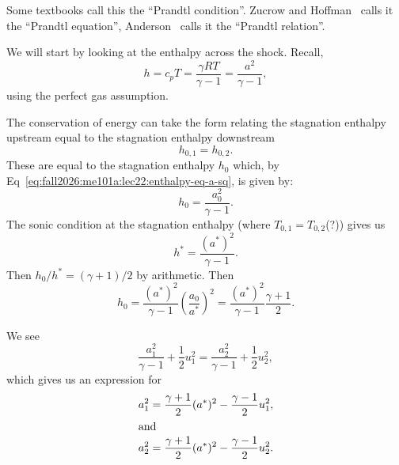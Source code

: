 \begin{aside}
Some textbooks call this the ``Prandtl condition''.
Zucrow and Hoffman~\cite[\S7--4(d)]{zucrow1976gas} calls it the ``Prandtl equation'',
Anderson~\cite[\S8.6]{anderson1984fundamentals} calls it the ``Prandtl relation''.
\end{aside}

\begin{node}
We will start by looking at the enthalpy across the shock. Recall,
\begin{equation}\label{eq:fall2026:me101a:lec22:enthalpy-eq-a-sq}
h = c_{p}T = \frac{\gamma RT}{\gamma-1}=\frac{a^{2}}{\gamma-1},
\end{equation}
using the perfect gas assumption.
\end{node}

\begin{node}
The conservation of energy can take the form relating the stagnation
enthalpy upstream equal to the stagnation enthalpy downstream
\begin{equation}
h_{0,1}=h_{0,2}.
\end{equation}
These are equal to the stagnation enthalpy $h_{0}$ which, by Eq~\eqref{eq:fall2026:me101a:lec22:enthalpy-eq-a-sq},
is given by:
\begin{equation}
h_{0}=\frac{a_{0}^{2}}{\gamma-1}.
\end{equation}
The sonic condition at the stagnation enthalpy (where $T_{0,1}=T_{0,2}$(?))
gives us
\begin{equation}
h^{*}=\frac{(a^{*})^{2}}{\gamma-1}.
\end{equation}
Then $h_{0}/h^{*}=(\gamma+1)/2$ by arithmetic. Then
\begin{equation}
h_{0}=\frac{(a^{*})^{2}}{\gamma-1}\left(\frac{a_{0}}{a^{*}}\right)^{2}=\frac{(a^{*})^{2}}{\gamma-1}\frac{\gamma+1}{2}.
\end{equation}
\end{node}

\begin{node}
We see
\begin{equation}
\frac{a_{1}^{2}}{\gamma-1}+\frac{1}{2}u_{1}^{2}=\frac{a_{2}^{2}}{\gamma-1}+\frac{1}{2}u_{2}^{2},
\end{equation}
which gives us an expression for
\begin{subequations}\label{eq:fall2026:lec22:me101a:eq-star}
  \begin{align}
a_{1}^{2} &= \frac{\gamma+1}{2}(a^{*})^{2}-\frac{\gamma-1}{2}u_{1}^{2},\\
\intertext{and}
a_{2}^{2} &= \frac{\gamma+1}{2}(a^{*})^{2}-\frac{\gamma-1}{2}u_{2}^{2}.
  \end{align}
\end{subequations}
\end{node}

